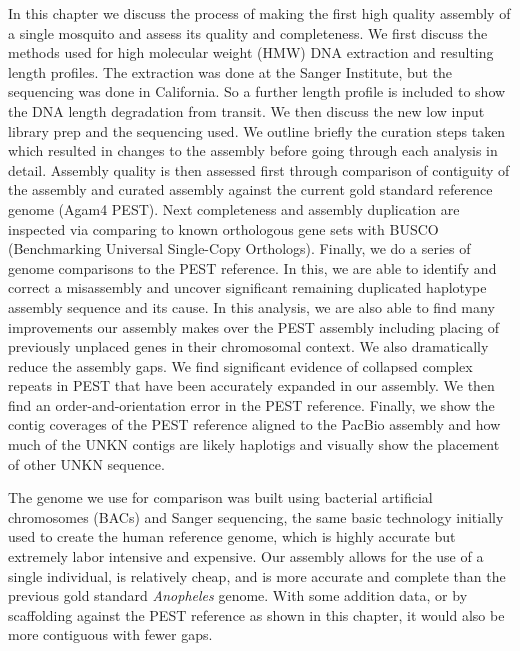 \par{
In this chapter we discuss the process of making the first high quality assembly of a single mosquito and assess its quality and completeness. We first discuss the methods used for high molecular weight (HMW) DNA extraction and resulting length profiles. The extraction was done at the Sanger Institute, but the sequencing was done in California. So a further length profile is included to show the DNA length degradation from transit. We then discuss the new low input library prep and the sequencing used. We outline briefly the curation steps taken which resulted in changes to the assembly before going through each analysis in detail. Assembly quality is then assessed first through comparison of contiguity of the assembly and curated assembly against the current gold standard reference genome (Agam4 PEST). Next completeness and assembly duplication are inspected via comparing to known orthologous gene sets with BUSCO (Benchmarking Universal Single-Copy Orthologs). Finally, we do a series of genome comparisons to the PEST reference. In this, we are able to identify and correct a misassembly and uncover significant remaining duplicated haplotype assembly sequence and its cause. In this analysis, we are also able to find many improvements our assembly makes over the PEST assembly including placing of previously unplaced genes in their chromosomal context. We also dramatically reduce the assembly gaps. We find significant evidence of collapsed complex repeats in PEST that have been accurately expanded in our assembly. We then find an order-and-orientation error in the PEST reference. Finally, we show the contig coverages of the PEST reference aligned to the PacBio assembly and how much of the UNKN contigs are likely haplotigs and visually show the placement of other UNKN sequence.
} \\

\par{
The genome we use for comparison was built using bacterial artificial chromosomes (BACs) and Sanger sequencing, the same basic technology initially used to create the human reference genome, which is highly accurate but extremely labor intensive and expensive. Our assembly allows for the use of a single individual, is relatively cheap, and is more accurate and complete than the previous gold standard \textit{Anopheles} genome. With some addition data, or by scaffolding against the PEST reference as shown in this chapter, it would also be more contiguous with fewer gaps.
}

